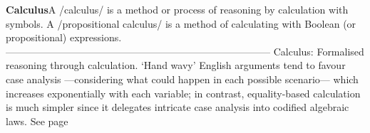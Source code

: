 \documentclass[11pt]{article}
\begin{document}
\vspace{1em}\textbf{Calculus}\quad\label{org-special-block-extras-glossary-Calculus}A /calculus/ is a method or process of reasoning by calculation with symbols. A /propositional calculus/ is a method of calculating with Boolean (or propositional) expressions.  --------------------------------------------------------------------------------  Calculus: Formalised reasoning through calculation.  ‘Hand wavy’ English arguments tend to favour case analysis —considering what could happen in each possible scenario— which increases exponentially with each variable; in contrast, equality-based calculation is much simpler since it delegates intricate case analysis into codified algebraic laws. See page \pageref{org-special-block-extras-glossary-declaration-site-Calculus}
\end{document}
